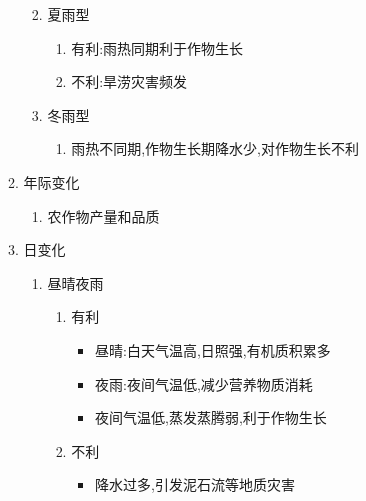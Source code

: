 \documentclass[a4paper]{article}
\begin{document}
\begin{enumerate}
\begin{enumerate}
\begin{enumerate}
\begin{enumerate}
                \end{enumerate}
                \item 夏雨型
                \begin{enumerate}
                    \item 有利:雨热同期利于作物生长
                    \item 不利:旱涝灾害频发
                \end{enumerate}
                \item 冬雨型
                \begin{enumerate}
                    \item 雨热不同期,作物生长期降水少,对作物生长不利
                \end{enumerate}
            \end{enumerate}
            \item 年际变化
            \begin{enumerate}
                \item 农作物产量和品质
            \end{enumerate}
            \item 日变化
            \begin{enumerate}
                \item 昼晴夜雨
                \begin{enumerate}
                    \item 有利
                    \begin{itemize}
                        \item 昼晴:白天气温高,日照强,有机质积累多
                        \item 夜雨:夜间气温低,减少营养物质消耗
                        \item 夜间气温低,蒸发蒸腾弱,利于作物生长
                    \end{itemize}
                    \item 不利
                    \begin{itemize}
                        \item 降水过多,引发泥石流等地质灾害
                    \end{itemize}
                \end{enumerate}
            \end{enumerate}
        \end{enumerate}
    \end{enumerate}
\end{document}
